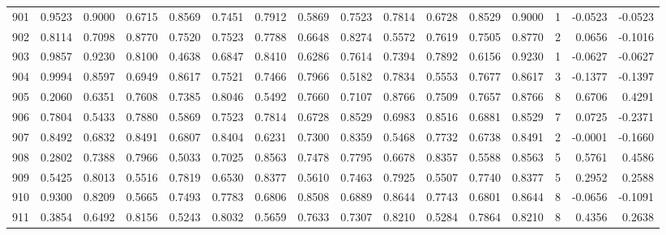 \begin{tabular}{lrrrrrrrrrrrrrrr}
901 &      0.9523 &  0.9000 &  0.6715 &  0.8569 &  0.7451 &  0.7912 &  0.5869 &  0.7523 &  0.7814 &  0.6728 &   0.8529 &     0.9000 &      1 &                   -0.0523 &                    -0.0523 \\
902 &      0.8114 &  0.7098 &  0.8770 &  0.7520 &  0.7523 &  0.7788 &  0.6648 &  0.8274 &  0.5572 &  0.7619 &   0.7505 &     0.8770 &      2 &                    0.0656 &                    -0.1016 \\
903 &      0.9857 &  0.9230 &  0.8100 &  0.4638 &  0.6847 &  0.8410 &  0.6286 &  0.7614 &  0.7394 &  0.7892 &   0.6156 &     0.9230 &      1 &                   -0.0627 &                    -0.0627 \\
904 &      0.9994 &  0.8597 &  0.6949 &  0.8617 &  0.7521 &  0.7466 &  0.7966 &  0.5182 &  0.7834 &  0.5553 &   0.7677 &     0.8617 &      3 &                   -0.1377 &                    -0.1397 \\
905 &      0.2060 &  0.6351 &  0.7608 &  0.7385 &  0.8046 &  0.5492 &  0.7660 &  0.7107 &  0.8766 &  0.7509 &   0.7657 &     0.8766 &      8 &                    0.6706 &                     0.4291 \\
906 &      0.7804 &  0.5433 &  0.7880 &  0.5869 &  0.7523 &  0.7814 &  0.6728 &  0.8529 &  0.6983 &  0.8516 &   0.6881 &     0.8529 &      7 &                    0.0725 &                    -0.2371 \\
907 &      0.8492 &  0.6832 &  0.8491 &  0.6807 &  0.8404 &  0.6231 &  0.7300 &  0.8359 &  0.5468 &  0.7732 &   0.6738 &     0.8491 &      2 &                   -0.0001 &                    -0.1660 \\
908 &      0.2802 &  0.7388 &  0.7966 &  0.5033 &  0.7025 &  0.8563 &  0.7478 &  0.7795 &  0.6678 &  0.8357 &   0.5588 &     0.8563 &      5 &                    0.5761 &                     0.4586 \\
909 &      0.5425 &  0.8013 &  0.5516 &  0.7819 &  0.6530 &  0.8377 &  0.5610 &  0.7463 &  0.7925 &  0.5507 &   0.7740 &     0.8377 &      5 &                    0.2952 &                     0.2588 \\
910 &      0.9300 &  0.8209 &  0.5665 &  0.7493 &  0.7783 &  0.6806 &  0.8508 &  0.6889 &  0.8644 &  0.7743 &   0.6801 &     0.8644 &      8 &                   -0.0656 &                    -0.1091 \\
911 &      0.3854 &  0.6492 &  0.8156 &  0.5243 &  0.8032 &  0.5659 &  0.7633 &  0.7307 &  0.8210 &  0.5284 &   0.7864 &     0.8210 &      8 &                    0.4356 &                     0.2638 \\

\end{tabular}
